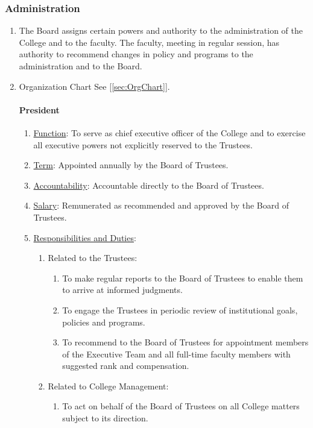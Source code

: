 		\subsubsection{Administration}
			\begin{enumerate}
				\item{The Board assigns certain powers and authority to the administration of the College and to the faculty. The faculty, meeting in regular session, has authority to recommend changes in policy and programs to the administration and to the Board.}
				\item{Organization Chart
				See [\autoref{sec:OrgChart}].


				\paragraph{President}
					\begin{enumerate}
						\item{\underline{Function}: To serve as chief executive officer of the College and to exercise all executive powers not explicitly reserved to the Trustees.  }
						\item{\underline{Term}: Appointed annually by the Board of Trustees.  }
						\item{\underline{Accountability}: Accountable directly to the Board of Trustees.  }
						\item{\underline{Salary}: Remunerated as recommended and approved by the Board of Trustees.  }
						\item{\underline{Responsibilities and Duties}:
							\begin{enumerate}
								\item{Related to the Trustees:
									\begin{enumerate}
										\item{To make regular reports to the Board of Trustees to enable them to arrive at informed judgments.}
										\item{To engage the Trustees in periodic review of institutional goals, policies and programs.}
										\item{To recommend to the Board of Trustees for appointment members of the Executive Team and all full-time faculty members with suggested rank and compensation.}
									\end{enumerate}
								}
								\item{Related to College Management:
									\begin{enumerate}
										\item{To act on behalf of the Board of Trustees on all College matters subject to its direction.}

\end{enumerate}}
\end{enumerate}}
\end{enumerate}}
\end{enumerate}
